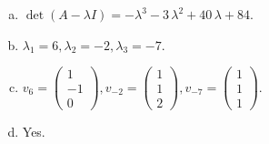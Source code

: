 \begin{questions}
\begin{solution}
\begin{enumerate}[(a)]
\item $\det(A-\lambda I)=-{\lambda}^{3} - 3 \, {\lambda}^{2} + 40 \, {\lambda} + 84$.
\item ${\lambda}_1=6, {\lambda}_2=-2, {\lambda}_3=-7$.
\item $v_{6}=\left(\begin{array}{r}
1 \\
-1 \\
0
\end{array}\right), v_{-2}=\left(\begin{array}{r}
1 \\
1 \\
2
\end{array}\right), v_{-7}=\left(\begin{array}{r}
1 \\
1 \\
1
\end{array}\right)$.
\item Yes.
\end{enumerate}
\end{solution}

\end{questions}

\newpage


\begin{center}
\end{center}


